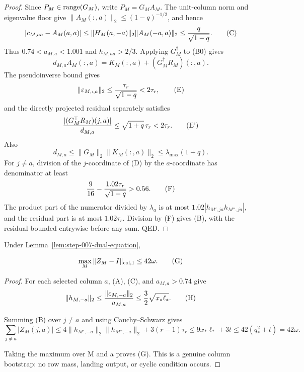 \begin{lemma}
\begin{proof}
Since $P_M\in{\rm range}(G_M)$, write $P_M=G_MA_M$. The unit-column norm
and eigenvalue floor give $\|A_M(:,a)\|_2\le(1-q)^{-1/2}$, and hence
\[
 |c_{M,aa}-A_M(a,a)|
 \le\|H_M(a,-a)\|_2\|A_M(-a,a)\|_2
 \le {q\over\sqrt{1-q}}.
\tag{C}
\]
Thus $0.74<a_{M,a}<1.001$ and $h_{M,aa}>2/3$. Applying $G_M^\dagger$ to
(B0) gives
\[
d_{M,a}A_M(:,a)=K_M(:,a)+(G_M^\dagger R_M)(:,a).
\tag{D}
\]
The pseudoinverse bound gives
\[
\|\varepsilon_{M,:,a}\|_2\le{\tau_r\over\sqrt{1-q}}<2\tau_r,
\tag{E}
\]
and the directly projected residual separately satisfies
\[
{ |(G_M^\top R_M)(j,a)|\over d_{M,a}}
 \le\sqrt{1+q}\,\tau_r<2\tau_r.
\tag{E'}
\]
Also
\[
d_{M,a}\le\|G_M\|_2\|K_M(:,a)\|_2
\le\lambda_{\max}(1+q).
\tag{A.6}
\]
For $j\ne a$, division of the $j$-coordinate of (D) by the $a$-coordinate
has denominator at least
\[
{9\over16}-{1.02\tau_r\over\sqrt{1-q}}>0.56.
\tag{F}
\]
The product part of the numerator divided by $\lambda_a$ is at most
$1.02|h_{M',ja}h_{M'',ja}|$, and the residual part is at most
$1.02\tau_r$. Division by (F) gives (B), with the residual bounded entrywise
before any sum. QED.



\end{proof}
\end{lemma}
\begin{proposition}\label{prop:step-007-column}

Under Lemma~\ref{lem:step-007-dual-equation},

\[
\max_M\|Z_M-I\|_{\rm col,1}\le42\omega.
\tag{G}
\]

\begin{proof}

For each selected column $a$, (A), (C), and $a_{M,a}>0.74$ give
\[
\|h_{M,-a}\|_2\le{\|c_{M,-a}\|_2\over a_{M,a}}
\le{3\over2}\sqrt{x_*\ell_*}.
\tag{H}
\]

Summing (B) over $j\ne a$ and using Cauchy--Schwarz gives
\[
\sum_{j\ne a}|Z_M(j,a)|
\le4\|h_{M',-a}\|_2\|h_{M'',-a}\|_2+3(r-1)\tau_r
\le9x_*\ell_*+3t\le42(q_*^2+t)=42\omega.
\tag{I}
\]

Taking the maximum over M and a proves (G).  This is a genuine column
bootstrap: no row mass, landing output, or cyclic condition occurs.
\end{proof}


\end{proposition}
